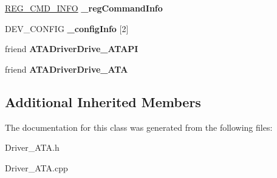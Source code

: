 \begin{DoxyCompactItemize}
\hyperlink{struct_a_t_a_driver_1_1_r_e_g___c_m_d___i_n_f_o}{R\+E\+G\+\_\+\+C\+M\+D\+\_\+\+I\+N\+FO} {\bfseries \+\_\+reg\+Command\+Info}
\item 
\mbox{\label{class_a_t_a_driver_a72cef04690e6c5f88880674b7a446330}} 
D\+E\+V\+\_\+\+C\+O\+N\+F\+IG {\bfseries \+\_\+config\+Info} \mbox{[}2\mbox{]}
\item 
\mbox{\label{class_a_t_a_driver_a4167e083539c514f9c918eaaa53498d9}} 
friend {\bfseries A\+T\+A\+Driver\+Drive\+\_\+\+A\+T\+A\+PI}
\item 
\mbox{\label{class_a_t_a_driver_af445e273bc5912b83369c581ba906e1b}} 
friend {\bfseries A\+T\+A\+Driver\+Drive\+\_\+\+A\+TA}
\end{DoxyCompactItemize}
\subsection*{Additional Inherited Members}


The documentation for this class was generated from the following files\+:\begin{DoxyCompactItemize}
\item 
Driver\+\_\+\+A\+T\+A.\+h\item 
Driver\+\_\+\+A\+T\+A.\+cpp\end{DoxyCompactItemize}
